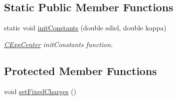 \subsection*{Static Public Member Functions}
\begin{DoxyCompactItemize}
\item 
static void \hyperlink{classCExpCenter_a4b8dab75eef2c0fee471f844a55d1af3}{init\-Constants} (double sdiel, double kappa)
\begin{DoxyCompactList}\small\item\em \hyperlink{classCExpCenter}{C\-Exp\-Center} init\-Constants function. \end{DoxyCompactList}\end{DoxyCompactItemize}
\subsection*{Protected Member Functions}
\begin{DoxyCompactItemize}
\item 
void \hyperlink{classCExpCenter_a44ea6f7aa0c0c37c721ed35e0b702703}{set\-Fixed\-Charges} ()
\end{DoxyCompactItemize}
